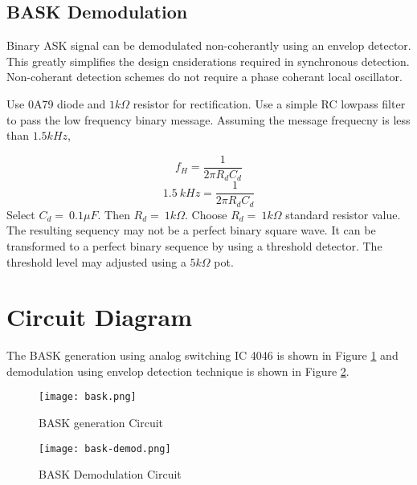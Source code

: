 \subsection*{BASK Demodulation}

Binary ASK signal can be demodulated non-coherantly using an envelop detector. This greatly simplifies the design cnsiderations required in synchronous detection. Non-coherant detection schemes  do not require a phase coherant local oscillator. 

\noindent Use 0A79 diode and $1 k\Omega $ resistor for rectification.
\noindent Use a simple RC lowpass filter to pass the low frequency binary message. Assuming the message frequecny is less than $1.5 kHz$,
 
\begin{equation}
f_H=\frac{1}{2\pi R_dC_d}
\end{equation}
\begin{equation}
1.5\ kHz=\frac{1}{2\pi R_dC_d}
\end{equation}
\noindent Select $C_d=\ 0.1 \mu F$. Then $R_d=\ 1k\Omega$.
Choose $R_d=\ 1k\Omega$ standard resistor value.\\

The resulting sequency may not be a perfect binary square wave. It can be transformed to a perfect binary sequence by using a threshold detector. The threshold level may adjusted using a $5 k\Omega$ pot.

\clearpage
\section*{Circuit Diagram}

The BASK generation using analog switching IC 4046 is shown in Figure \ref{bask-gen} and demodulation using envelop detection technique is shown in Figure \ref{bask-det}.

\begin{figure}
\texttt{[image: bask.png]}
\caption{BASK generation Circuit}
\label{bask-gen}
\end{figure}

\begin{figure}
	\texttt{[image: bask-demod.png]}
	\caption{BASK Demodulation Circuit}
	\label{bask-det}
\end{figure}


